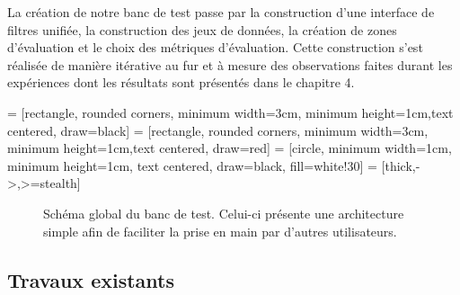 La création de notre banc de test passe par la construction d'une interface de filtres unifiée, la construction des jeux de données, la création de zones d'évaluation et le choix des métriques d'évaluation. Cette construction s'est réalisée de manière itérative au fur et à mesure des observations faites durant les expériences dont les résultats sont présentés dans le chapitre 4.

 = [rectangle, rounded corners, minimum width=3cm, minimum height=1cm,text centered, draw=black]
 = [rectangle, rounded corners, minimum width=3cm, minimum height=1cm,text centered, draw=red]
 = [circle, minimum width=1cm, minimum height=1cm, text centered, draw=black, fill=white!30]
 = [thick,->,>=stealth]

\begin{figure}[!ht]
  \centering
  \caption{Schéma global du banc de test. Celui-ci présente une architecture simple afin de faciliter la prise en main par d'autres utilisateurs.}
  \label{fig:schéma banc de test}
\end{figure}

\subsection{Travaux existants}

